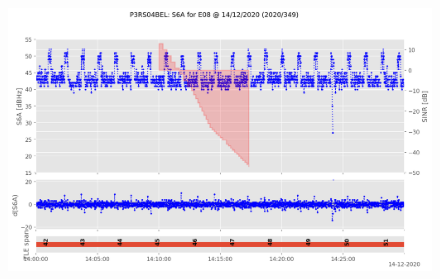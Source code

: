 \begin{enumerate}
\begin{figure}[H]%
\centering%
\includegraphics[width=0.95\linewidth]{png/P3RS04BEL_R_20203490000_01D_00U_MO_E-S6A-E08.png}%
\end{figure}


\end{enumerate}
